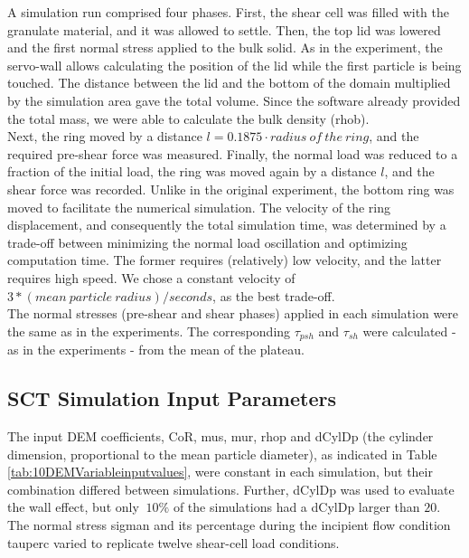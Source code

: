 A simulation run comprised four phases. 
First, the shear cell was filled with the granulate material, and it was allowed
to settle.
Then, the top lid was lowered and the first normal stress applied to the bulk
solid.
As in the experiment, the servo-wall allows calculating the position of the lid
while the first particle is being touched. 
The distance between the lid and the bottom of the domain multiplied by the 
simulation area gave the total volume.
Since the software already provided the total mass, we were able to calculate
the bulk density (\acs{rhob}).\\
Next, the ring moved by a distance $l=0.1875 \cdot radius ~of ~the ~ring$, and
the required pre-shear force was measured.
Finally, the normal load was reduced to a fraction of the initial load, 
the ring was moved again by a distance $l$, and the shear force was recorded. 
Unlike in the original experiment, the bottom ring was moved to facilitate the numerical simulation. 
The velocity of the ring displacement, and consequently the total simulation time, 
was determined by a trade-off between minimizing the normal load oscillation and
optimizing computation time. 
The former requires (relatively) low velocity, and the latter requires high
speed.
We chose a constant velocity of $3*(mean ~ particle ~ radius)/seconds$, as the
best trade-off.\\
The normal stresses (pre-shear and shear phases) applied in each simulation were
the same as in the experiments.
The corresponding $\tau_{psh}$ and $\tau_{sh}$ were calculated - as in the experiments - from the mean of the plateau.\\

\subsection{SCT Simulation Input Parameters}
\label{subsec:sctsimulationinputparameters}

The input \acs{DEM} coefficients, \acs{CoR}, \acs{mus}, \acs{mur},
\acs{rhop} and \acs{dCylDp} (the cylinder dimension, proportional to the mean
particle diameter), as indicated in Table \ref{tab:10DEMVariableinputvalues}, 
were constant in each simulation, but their combination differed between
simulations.
Further, \acs{dCylDp} was used to evaluate the wall effect, but only $~10\%$ of the
simulations had a \acs{dCylDp} larger than $20$.
The normal stress \acs{sigman} and its
percentage during the incipient flow condition \acs{tauperc}
varied to replicate twelve shear-cell load conditions.\\ 

